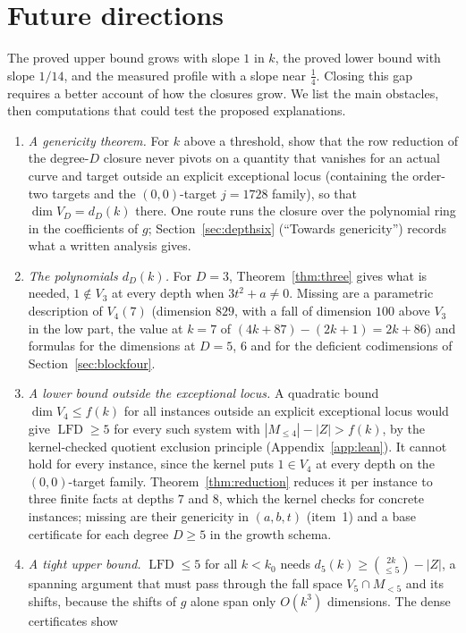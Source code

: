 \documentclass[11pt]{article}
\theoremstyle{definition}\newtheorem{definition}[theorem]{Definition}
\theoremstyle{remark}\newtheorem{remark}[theorem]{Remark}
\newcommand{\lfd}{\operatorname{LFD}}
\begin{document}
\section{Future directions}\label{sec:future}
The proved upper bound grows with slope $1$ in $k$, the proved lower bound
with slope $1/14$, and the measured profile with a slope near $\tfrac14$.
Closing this gap requires a better account of how the closures grow. We list
the main obstacles, then computations that could test the proposed
explanations.
\begin{enumerate}
\item \emph{A genericity theorem.} For $k$ above a threshold, show that the
 row reduction of the degree-$D$ closure never pivots on a quantity that
 vanishes for an actual curve and target outside an explicit exceptional
 locus (containing the order-two targets and the $(0,0)$-target $j=1728$
 family), so that $\dim V_D=d_D(k)$ there. One route runs the closure over
 the polynomial ring in the coefficients of $g$; Section~\ref{sec:depthsix}
 (``Towards genericity'') records what a written analysis gives.
\item \emph{The polynomials $d_D(k)$.} For $D=3$, Theorem~\ref{thm:three}
 gives what is needed, $1\notin V_3$ at every depth when $3t^2+a\ne0$.
 Missing are a parametric description of $V_4(7)$ (dimension $829$, with a
 fall of dimension $100$ above $V_3$ in the low part, the value at $k=7$ of
 $(4k+87)-(2k+1)=2k+86$) and formulas for the dimensions at $D=5$, $6$ and
 for the deficient codimensions of Section~\ref{sec:blockfour}.
\item \emph{A lower bound outside the exceptional locus.} A quadratic bound
 $\dim V_4\le f(k)$ for all instances outside an explicit exceptional locus
 would give $\lfd\ge5$ for every such system with $|M_{\le4}|-|Z|>f(k)$, by
 the kernel-checked quotient exclusion principle (Appendix~\ref{app:lean}).
 It cannot hold for every instance, since the kernel puts $1\in V_4$ at
 every depth on the $(0,0)$-target family. Theorem~\ref{thm:reduction}
 reduces it per instance to three finite facts at depths $7$ and $8$, which
 the kernel checks for concrete instances; missing are their genericity in
 $(a,b,t)$ (item~1) and a base certificate for each degree $D\ge5$ in the
 growth schema.
\item \emph{A tight upper bound.} $\lfd\le5$ for all $k<k_0$ needs
 $d_5(k)\ge\binom{2k}{\le5}-|Z|$, a spanning argument that must pass
 through the fall space $V_5\cap M_{<5}$ and its shifts, because the shifts
 of $g$ alone span only $O(k^3)$ dimensions. The dense certificates show

\end{enumerate}
\end{document}
